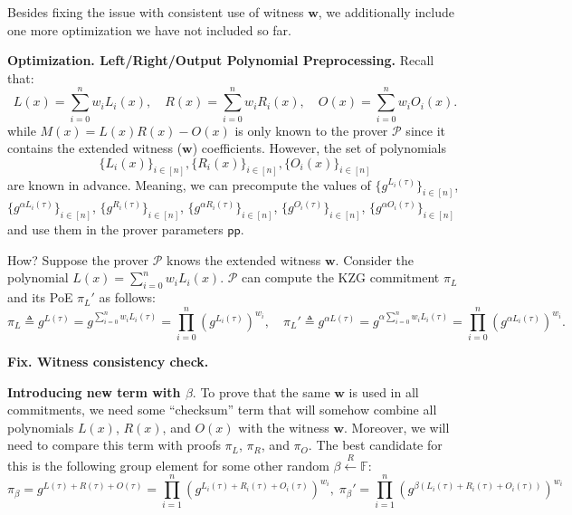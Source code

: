 \documentclass[../lecture-notes.tex]{subfiles}
\begin{document}
Besides fixing the issue with consistent use of witness $\mathbf{w}$, we additionally include one more optimization we have not included so far.

\textcolor{blue!75!gray}{\textbf{Optimization. Left/Right/Output Polynomial Preprocessing.}} Recall that:
\begin{equation*}
    L(x) = \sum_{i=0}^n w_iL_i(x), \quad R(x) = \sum_{i=0}^n w_i R_i(x), \quad O(x) = \sum_{i=0}^n w_iO_i(x).
\end{equation*}
while $M(x) = L(x)R(x) - O(x)$ is only known to the prover $\mathcal{P}$ since it contains the extended witness ($\mathbf{w}$) coefficients. However, the set of polynomials
\begin{equation*}
    \{L_i(x)\}_{i \in [n]}, \{R_i(x)\}_{i \in [n]}, \{O_i(x)\}_{i \in [n]}
\end{equation*}
are known in advance. Meaning, we can precompute the values of $\{g^{L_i(\tau)}\}_{i \in [n]}$, $\{g^{\alpha L_i(\tau)}\}_{i \in [n]}$, $\{g^{R_i(\tau)}\}_{i \in [n]}$, $\{g^{\alpha R_i(\tau)}\}_{i \in [n]}$, $\{g^{O_i(\tau)}\}_{i \in [n]}$, $\{g^{\alpha O_i(\tau)}\}_{i \in [n]}$ and use them in the prover parameters $\mathsf{pp}$.

How? Suppose the prover $\mathcal{P}$ knows the extended witness $\mathbf{w}$. Consider the polynomial $L(x) = \sum_{i=0}^n w_iL_i(x)$. $\mathcal{P}$ can compute the KZG commitment $\pi_L$ and its PoE $\pi_L'$ as follows:
\begin{equation*}
    \pi_L \triangleq g^{L(\tau)} = g^{\sum_{i=0}^n w_iL_i(\tau)} = \prod_{i=0}^n (g^{L_i(\tau)})^{w_i}, \quad \pi_L' \triangleq g^{\alpha L(\tau)} = g^{\alpha \sum_{i=0}^n w_iL_i(\tau)} = \prod_{i=0}^n (g^{\alpha L_i(\tau)})^{w_i}.
\end{equation*}

\textcolor{green!50!black}{\textbf{Fix. Witness consistency check.}} 

\textbf{Introducing new term with $\beta$}. To prove that the same $\mathbf{w}$ is used in all commitments, we need some ``checksum'' term that will somehow combine all polynomials $L(x)$, $R(x)$, and $O(x)$ with the witness $\mathbf{w}$. Moreover, we will need to compare this term with proofs $\pi_L$, $\pi_R$, and $\pi_O$. The best candidate for this is the following group element for some other random $\beta \xleftarrow{R} \mathbb{F}$:
\begin{equation*}
    \pi_{\beta} = g^{L(\tau) + R(\tau) + O(\tau)} = \prod_{i=1}^n (g^{L_i(\tau) + R_i(\tau) + O_i(\tau)})^{w_i}, \; \pi_{\beta}' = \prod_{i=1}^n (g^{\beta(L_i(\tau) + R_i(\tau) + O_i(\tau))})^{w_i}
\end{equation*}
\end{document}
